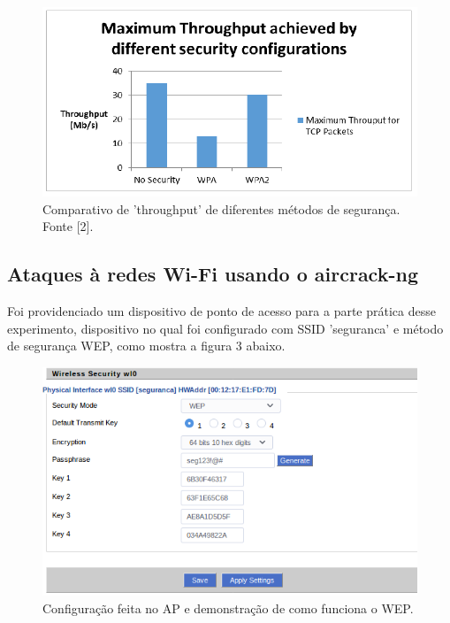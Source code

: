 \documentclass[journal]{IEEEtran}
\begin{document}
\begin{figure}[h!]
	\includegraphics[width=\linewidth]{../pictures/throughput.PNG}
	\caption{Comparativo de 'throughput' de diferentes métodos de segurança. Fonte [2].}
	\label{fig:throughput_wpa}
\end{figure}

\subsection{Ataques à redes Wi-Fi usando o aircrack-ng}
Foi providenciado um dispositivo de ponto de acesso para a parte prática desse experimento, dispositivo no qual foi configurado com SSID 'seguranca' e método de segurança WEP, como mostra a figura 3 abaixo.
\vfill

\begin{figure}[h!]
	\includegraphics[width=\linewidth]{../pictures/WEP_passphrase.png}
	\caption{Configuração feita no AP e demonstração de como funciona o WEP.}
	\label{fig:WEP}
\end{figure}
\end{document}
